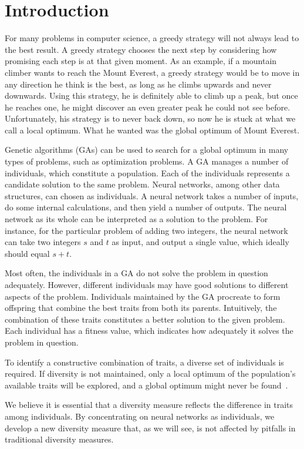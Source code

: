 \section{Introduction}
For many problems in computer science, a greedy strategy will not always lead to the best result. A greedy strategy chooses the next step by considering how promising each step is at that given moment. As an example, if a mountain climber wants to reach the Mount Everest, a greedy strategy would be to move in any direction he think is the best, as long as he climbs upwards and never downwards. Using this strategy, he is definitely able to climb up a peak, but once he reaches one, he might discover an even greater peak he could not see before. Unfortunately, his strategy is to never back down, so now he is stuck at what we call a local optimum. What he wanted was the global optimum of Mount Everest.
 
Genetic algorithms (GAs) can be used to search for a global optimum in many types of problems, such as optimization problems. A GA manages a number of individuals, which constitute a population. Each of the individuals represents a candidate solution to the same problem. Neural networks, among other data structures, can chosen as individuals. A neural network takes a number of inputs, do some internal calculations, and then yield a number of outputs.
The neural network as its whole can be interpreted as a solution to the problem.
For instance, for the particular problem of adding two integers, the neural network can take two integers $s$ and $t$ as input, and output a single value, which ideally should equal $s + t$.

Most often, the individuals in a GA do not solve the problem in question adequately.
However, different individuals may have good solutions to different aspects of the problem.
Individuals maintained by the GA procreate to form offspring that combine the best traits from both its parents. Intuitively, the combination of these traits constitutes a better solution to the given problem. Each individual has a fitness value, which indicates how adequately it solves the problem in question.

To identify a constructive combination of traits, a diverse set of individuals is required. If diversity is not maintained, only a local optimum of the population's available traits will be explored, and a global optimum might never be found~\cite{ursem2002diversity,Darwen00doesextra}.

We believe it is essential that a diversity measure reflects the difference in traits among individuals. By concentrating on neural networks as individuals, we develop a new diversity measure that, as we will see, is not affected by pitfalls in traditional diversity measures.

